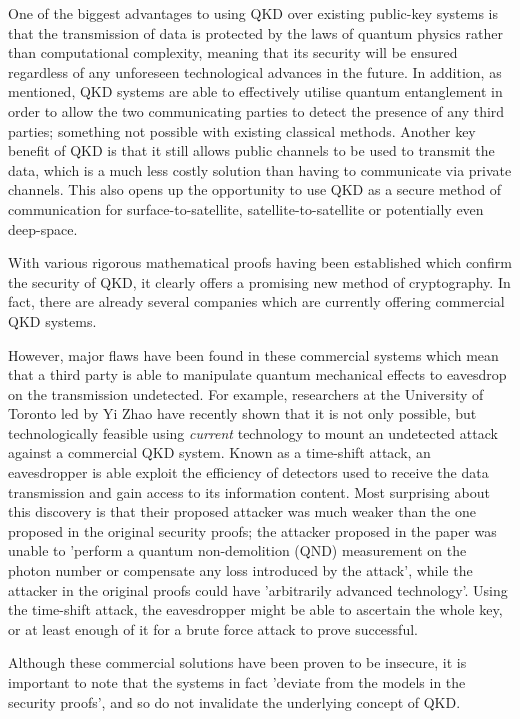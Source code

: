 \documentclass[runningheads,a4paper]{llncs}
\begin{document}
One of the biggest advantages to using QKD over existing public-key systems is that the transmission of data is protected by the laws of quantum physics rather than computational complexity, meaning that its security will be ensured regardless of any unforeseen technological advances in the future. In addition, as mentioned, QKD systems are able to effectively utilise quantum entanglement in order to allow the two communicating parties to detect the presence of any third parties; something not possible with existing classical methods. Another key benefit of QKD is that it still allows public channels to be used to transmit the data, which is a much less costly solution than having to communicate via private channels. This also opens up the opportunity to use QKD as a secure method of communication for surface-to-satellite, satellite-to-satellite or potentially even deep-space\cite{Hughes:2000uq}.

With various rigorous mathematical proofs having been established which confirm the security of QKD\cite{Deutsch:1996fk}\cite{Shor:2000uq}, it clearly offers a promising new method of cryptography. In fact, there are already several companies which are currently offering commercial QKD systems. 

However, major flaws have been found in these commercial systems which mean that a third party is able to manipulate quantum mechanical effects to eavesdrop on the transmission undetected\cite{Wiechers:2011fk}\cite{Zhao:2008fk}. For example, researchers at the University of Toronto led by Yi Zhao have recently shown that it is not only possible, but technologically feasible using \emph{current} technology to mount an undetected attack against a commercial QKD system. Known as a time-shift attack, an eavesdropper is able exploit the efficiency of detectors used to receive the data transmission and gain access to its information content. Most surprising about this discovery is that their proposed attacker was much weaker than the one proposed in the original security proofs; the attacker proposed in the paper was unable to 'perform a quantum non-demolition (QND) measurement on the photon number or compensate any loss introduced by the attack', while the attacker in the original proofs could have 'arbitrarily advanced technology'. Using the time-shift attack, the eavesdropper might be able to ascertain the whole key, or at least enough of it for a brute force attack to prove successful. 

Although these commercial solutions have been proven to be insecure, it is important to note that the systems in fact 'deviate from the models in the security proofs'\cite{Lydersen:2010qy}, and so do not invalidate the underlying concept of QKD. 
\end{document}
